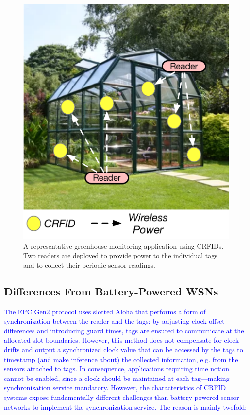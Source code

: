 \documentclass[10pt,journal,compsoc]{IEEEtran}
\newcommand{\add}[1]{\textcolor{blue}{#1}}
\begin{document}
\begin{figure}
	\centering
	\includegraphics[width=0.75\columnwidth]{figures/scenario.pdf}
	\caption{\label{fig:motivation}\color{blue}A representative greenhouse monitoring application using CRFIDs. Two readers are deployed to provide power to the individual tags and to collect their periodic sensor readings.}
\end{figure}

\subsection{Differences From Battery-Powered WSNs }
\label{sec:Motivation}

\add{The EPC Gen2 protocol uses slotted Aloha that performs a form of synchronization between the reader and the tags: by adjusting clock offset differences and introducing guard times, tags are ensured to communicate at the allocated slot boundaries. However, this method does not compensate for clock drifts and output a synchronized clock value that can be accessed by the tags to timestamp (and make inference about) the collected information, e.g. from the sensors attached to tags. In consequence, applications requiring time notion cannot be enabled, since a clock should be maintained at each tag---making synchronization service mandatory. However, the characteristics of CRFID systems expose fundamentally different challenges than battery-powered sensor networks to implement the synchronization service. The reason is mainly twofold:}
\end{document}
